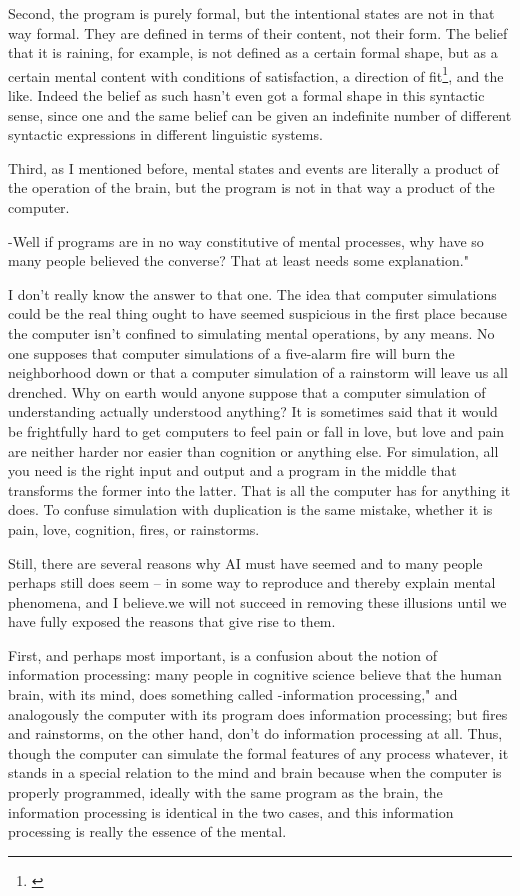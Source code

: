 Second, the program is purely formal, but the intentional states are not in that way formal. They are defined in
terms of their content, not their form. The belief that it is raining, for example, is not defined as a certain formal
shape, but as a certain mental content with conditions of satisfaction, a direction of fit\footnote{\citeauthor[See][]{Searle2}}, and the
like. Indeed the belief as such hasn't even got a formal shape in this syntactic sense, since one and the same
belief can be given an indefinite number of different syntactic expressions in different linguistic systems.

Third, as I mentioned before, mental states and events are literally a product of the operation of the brain, but
the program is not in that way a product of the computer.

-Well if programs are in no way constitutive of mental processes, why have so many people believed the
converse? That at least needs some explanation."

I don't really know the answer to that one. The idea that computer simulations could be the real thing ought to
have seemed suspicious in the first place because the computer isn't confined to simulating mental operations, by
any means. No one supposes that computer simulations of a five-alarm fire will burn the neighborhood down or
that a computer simulation of a rainstorm will leave us all drenched. Why on earth would anyone suppose that a
computer simulation of understanding actually understood anything? It is sometimes said that it would be
frightfully hard to get computers to feel pain or fall in love, but love and pain are neither harder nor easier than
cognition or anything else. For simulation, all you need is the right input and output and a program in the middle
that transforms the former into the latter. That is all the computer has for anything it does. To confuse simulation
with duplication is the same mistake, whether it is pain, love, cognition, fires, or rainstorms.

Still, there are several reasons why AI must have seemed and to many people perhaps still does seem -- in
some way to reproduce and thereby explain mental phenomena, and I believe.we will not succeed in removing
these illusions until we have fully exposed the reasons that give rise to them.

First, and perhaps most important, is a confusion about the notion of information processing: many people in
cognitive science believe that the human brain, with its mind, does something called -information processing,"
and analogously the computer with its program does information processing; but fires and rainstorms, on the
other hand, don't do information processing at all. Thus, though the computer can simulate the formal features
of any process whatever, it stands in a special relation to the mind and brain because when the computer is
properly programmed, ideally with the same program as the brain, the information processing is identical in the
two cases, and this information processing is really the essence of the mental.

